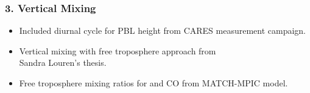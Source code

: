 \begin{frame}
    \frametitle{3. Vertical Mixing}

    \vspace{-5mm}
    \begin{itemize}
        \item Included diurnal cycle for PBL height from CARES measurement campaign. \vspace{5mm}
        \item Vertical mixing with free troposphere approach from \\ Sandra Louren's thesis. \vspace{5mm}
        \item Free troposphere mixing ratios for  and CO from MATCH-MPIC model. 
    \end{itemize}
\end{frame}

{
    \begin{frame}[plain]
    \end{frame}
}

